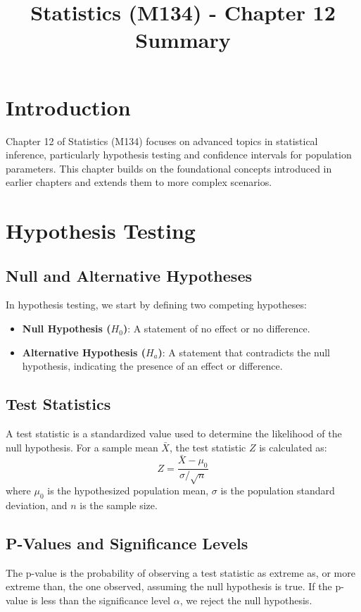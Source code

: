 \documentclass{article}
\title{Statistics (M134) - Chapter 12 Summary}
\author{}
\date{}
\begin{document}
\maketitle

\section{Introduction}
Chapter 12 of Statistics (M134) focuses on advanced topics in statistical inference, particularly hypothesis testing and confidence intervals for population parameters. This chapter builds on the foundational concepts introduced in earlier chapters and extends them to more complex scenarios.

\section{Hypothesis Testing}
\subsection{Null and Alternative Hypotheses}
In hypothesis testing, we start by defining two competing hypotheses:
\begin{itemize}
    \item \textbf{Null Hypothesis ($H_0$)}: A statement of no effect or no difference.
    \item \textbf{Alternative Hypothesis ($H_a$)}: A statement that contradicts the null hypothesis, indicating the presence of an effect or difference.
\end{itemize}

\subsection{Test Statistics}
A test statistic is a standardized value used to determine the likelihood of the null hypothesis. For a sample mean $\bar{X}$, the test statistic $Z$ is calculated as:
\[
Z = \frac{\bar{X} - \mu_0}{\sigma / \sqrt{n}}
\]
where $\mu_0$ is the hypothesized population mean, $\sigma$ is the population standard deviation, and $n$ is the sample size.

\subsection{P-Values and Significance Levels}
The p-value is the probability of observing a test statistic as extreme as, or more extreme than, the one observed, assuming the null hypothesis is true. If the p-value is less than the significance level $\alpha$, we reject the null hypothesis.
\end{document}
